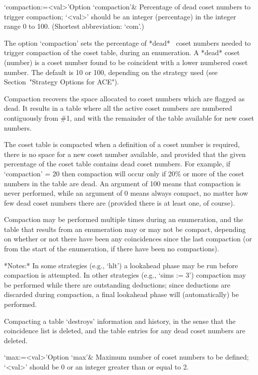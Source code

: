\>`compaction:=<val>'{Option `compaction'}&
Percentage of dead coset numbers to trigger compaction;
`<val>' should be an integer (percentage) in the integer range 0 to 100.
(Shortest abbreviation: `com'.)

The option `compaction'  sets  the  percentage  of  *dead*~ coset numbers needed  to  trigger  compaction  of  the
coset table, during an enumeration. A *dead* coset (number) is a coset
number found to be coincident with a lower numbered coset number.  The
default  is  10  or  100,  depending  on  the   strategy   used   (see
Section~"Strategy Options for ACE").

Compaction recovers the space allocated to  coset  numbers  which  are
flagged as dead. It results in a table  where  all  the  active  coset
numbers are numbered contiguously from \#1, and with the remainder  of
the table available for new coset numbers.

The coset table is compacted when a definition of a  coset  number  is
required, there is no space for a  new  coset  number  available,  and
provided that the given percentage of the coset  table  contains  dead
coset numbers. For example, if `compaction'  =  $20$  then  compaction
will occur only if 20\% or more of the coset numbers in the table  are
dead. An argument of 100 means that  compaction  is  never  performed,
while an argument of 0 means always compact, no matter  how  few  dead
coset numbers there are (provided there is at least one, of course).

Compaction may be performed  multiple times during an enumeration, and
the table that results from an  enumeration may or may not be compact,
depending on whether or not there have been any coincidences since the
last compaction (or  from the start of the  enumeration, if there have
been no compactions).

*Notes:*
In some strategies (e.g., `hlt') a lookahead phase may be  run  before
compaction is attempted. In  other  strategies  (e.g.,  `sims  :=  3')
compaction may be performed while there  are  outstanding  deductions;
since deductions are discarded during compaction,  a  final  lookahead
phase will (automatically) be performed.

Compacting a table \lq{}destroys'  information  and  history,  in  the
sense that the coincidence list is deleted, and the table entries  for
any dead coset numbers are deleted.

\>`max:=<val>'{Option `max'}&
Maximum number of coset numbers to be defined;
`<val>' should be $0$ or an integer greater than or equal to 2.

